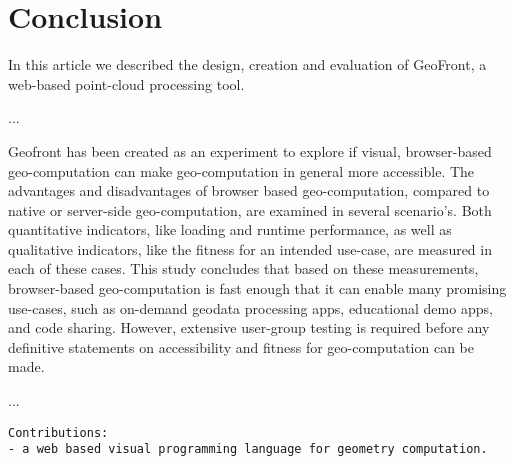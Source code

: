 \chapter{Conclusion}


In this article we described the design, creation and evaluation of GeoFront, a web-based point-cloud processing tool.

...

Geofront has been created as an experiment to explore if visual, 
browser-based geo-computation can make geo-computation in general more accessible. 
The advantages and disadvantages of browser based geo-computation, compared to native or server-side geo-computation, are examined in several scenario's. 
Both quantitative indicators, like loading and runtime performance, as well as qualitative indicators, like the fitness for an intended use-case, are measured in each of these cases.
This study concludes that based on these measurements, browser-based geo-computation  is fast enough that it can enable many promising use-cases, such as on-demand geodata processing apps, educational demo apps, and code sharing. However, extensive user-group testing is required before any definitive statements on accessibility and fitness for geo-computation can be made.  

...

\begin{lstlisting}
Contributions: 
- a web based visual programming language for geometry computation.  

\end{lstlisting}










